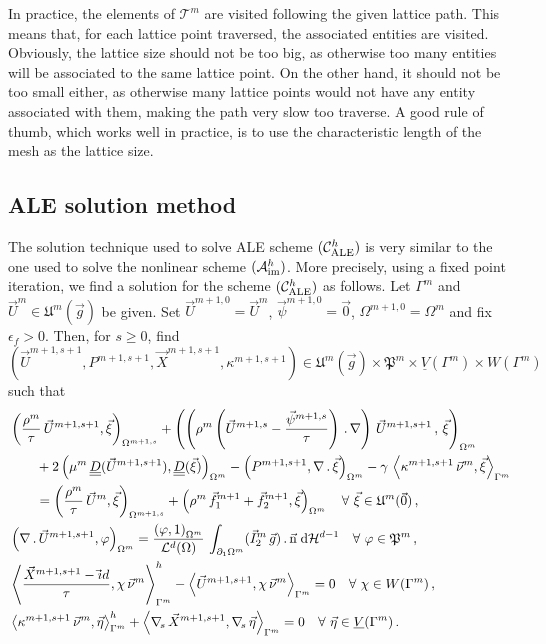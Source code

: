 \documentclass[a4paper,12pt,onecolumn]{article}
\newcommand{\vol}{\mathcal{L}^d}
\newcommand{\dH}[1]{\;{\rm d}{\cal H}^{#1}} %
\newcommand{\Vh}{\underline{V}(\Gamma^m)}
\newcommand{\Wh}{W(\Gamma^m)}
\newcommand{\uspacediscale}[2]{\mathfrak{U}^{#2}(\vec{#1})} %
\newcommand{\pspaceale}{\mathfrak{P}} %
\newcommand{\nabs}{\nabla_{\!s}}
\newcommand{\id}{\rm id}
\newcommand{\unitn}{\vec{\rm n}}
\newcommand{\mat}[1]{\underline{\underline{#1}}\rule{0pt}{0pt}}
\newcommand{\schemeAim}{{\mathcal{A}^h_{\rm im}}}
\newcommand{\schemeALE}{{\mathcal{C}^h_{\rm ALE}}}
\begin{document}
In practice, the elements of $\mathcal{T}^m$ are visited following the given
lattice path. This means that, for each lattice point traversed, the associated
entities are visited. Obviously, the lattice size should not be too big, as
otherwise too many entities will be associated to the same lattice point. On the
other hand, it should not be too small either, as otherwise many lattice points
would not have any entity associated with them, making the path very slow too
traverse. A good rule of thumb, which works well in practice, is to use the
characteristic length of the mesh as the lattice size.

\subsection{ALE solution method}\label{sec:ale_solution_method}
The solution technique used to solve ALE scheme $(\schemeALE)$ is
very similar to the one used to solve the nonlinear scheme $(\schemeAim)$.
More precisely, using a fixed point iteration, we find
a solution for the scheme $(\schemeALE)$ as follows. Let $\Gamma^m$
and $\vec U^m\in \uspacediscale{g}{m}$ be given.
Set $\vec U^{m+1,0}=\vec U^m$, $\vec \psi^{m+1,0} =
\vec 0$, $\Omega^{m+1,0}=\Omega^m$ and fix $\epsilon_f > 0$.
Then, for $s \geq 0$,
find $(\vec U^{m+1,s+1},P^{m+1,s+1}, \vec X^{m+1,s+1}, \kappa^{m+1,s+1}) \in
\uspacediscale{g}{m}\times \pspaceale^m \times \Vh \times \Wh$ such that
\begin{subequations}
\begin{align}
& \left( \frac{\rho^m}{\tau}\,\vec U^{m+1,s+1}, \vec
\xi\right)_{\Omega^{m+1,s}} + \left(\left(\rho^m\left(\vec
U^{m+1,s}-\frac{\vec\psi^{m+1,s}}{\tau}\right)\,.\,\nabla\right)\,
\vec U^{m+1,s+1}\,, \,\vec \xi \right)_{\Omega^m}\nonumber \\
& \qquad + 2\left(\mu^m\,\mat D(\vec U^{m+1,s+1}), \mat D(\vec \xi)
\right)_{\Omega^m} - \left(P^{m+1,s+1}, \nabla\,.\,\vec \xi\right)_{\Omega^m}
- \gamma\,\left\langle \kappa^{m+1,s+1}\,\vec\nu^m,
\vec\xi\right\rangle_{\Gamma^m} \nonumber \\
& \qquad = \left(\frac{\rho^m}{\tau}\,\vec U^m,\vec \xi
\right)_{\Omega^{m+1,s}}
+ \left(\rho^m\,\vec f_1^{m+1}+\vec f_2^{m+1}, \vec \xi\right)_{\Omega^m}
\quad \forall\ \vec\xi \in \uspacediscale{0}{m}\,, \label{eq:ns_HGalea} \\
& \left(\nabla\,.\,\vec U^{m+1,s+1}, \varphi\right)_{\Omega^m}  =
 \frac{\left(\varphi, 1\right)_{\Omega^m}}{\vol(\Omega)}\,
\int_{\partial_1\Omega^m} (\vec I^m_2\,\vec g) \,.\, \unitn \dH{d-1}
\quad \forall\ \varphi \in \pspaceale^m\,,\label{eq:ns_HGaleb} \\
&  \left\langle \frac{\vec X^{m+1,s+1} - \vec\id}{\tau} ,\chi\,\vec\nu^m
\right\rangle_{\Gamma^m}^h - \left\langle \vec U^{m+1,s+1}, \chi\,\vec\nu^m
\right\rangle_{\Gamma^m}  = 0 \quad \forall\ \chi \in \Wh\,,
\label{eq:ns_HGalec}\\
& \left\langle \kappa^{m+1,s+1}\,\vec\nu^m, \vec\eta \right\rangle_{\Gamma^m}^h
+ \left\langle \nabs\,\vec X^{m+1,s+1}, \nabs\,\vec \eta
\right\rangle_{\Gamma^m} = 0 \quad \forall\ \vec\eta \in \Vh\,.
\label{eq:ns_HGaled}
\end{align}
\end{subequations}
\end{document}
